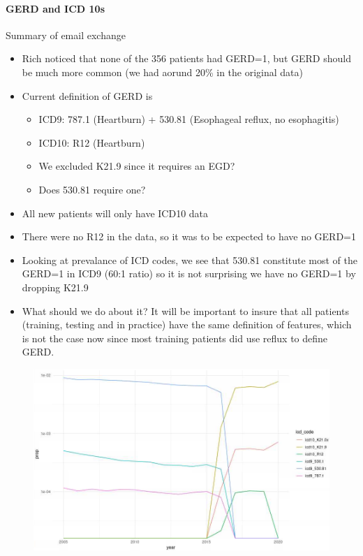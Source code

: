\documentclass[12pt]{article}
\begin{document}
\paragraph*{GERD and ICD 10s}
Summary of email exchange
\begin{itemize}
	\item Rich noticed that none of the 356 patients had GERD=1, but GERD should be much more common (we had aorund 20\% in the original data)
	\item Current definition of GERD is
	\begin{itemize}
		\item ICD9: 787.1 (Heartburn) + 530.81 (Esophageal reflux, no esophagitis)
		\item ICD10: R12 (Heartburn)
		\item We excluded K21.9 since it requires an EGD?
		\item Does 530.81 require one?
	\end{itemize}
	\item All new patients will only have ICD10 data
	\item There were no R12 in the data, so it was to be expected to have no GERD=1
	\item Looking at prevalance of ICD codes, we see that 530.81 constitute most of the GERD=1 in ICD9 (60:1 ratio) so it is not surprising we have no GERD=1 by dropping K21.9
	\item What should we do about it? It will be important to insure that all patients (training, testing and in practice) have the same definition of features, which is not the case now since most training patients did use reflux to define GERD. 
\end{itemize}

\begin{figure}[h]
\centering
\includegraphics[width=1.0\textwidth]{figures/image.png}
\end{figure}
\end{document}
